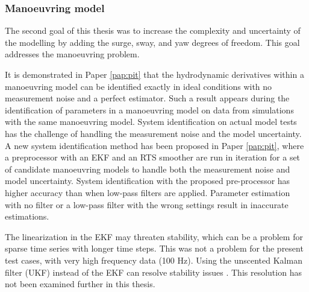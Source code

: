 \subsubsection*{\normalfont \color{black} \textbf{Manoeuvring model}}
The second goal of this thesis was to increase the complexity and uncertainty of the modelling by adding the surge, sway, and yaw degrees of freedom. This goal addresses the manoeuvring problem. 

It is demonstrated in Paper \ref{pap:pit} that the hydrodynamic derivatives within a manoeuvring model can be identified exactly in ideal conditions with no measurement noise and a perfect estimator. Such a result appears during the identification of parameters in a manoeuvring model on data from simulations with the same manoeuvring model.
System identification on actual model tests has the challenge of handling the measurement noise and the model uncertainty. A new system identification method has been proposed in Paper \ref{pap:pit}, where a preprocessor with an EKF and an RTS smoother are run in iteration for a set of candidate manoeuvring models to handle both the measurement noise and model uncertainty. System identification with the proposed pre-processor has higher accuracy than when low-pass filters are applied. Parameter estimation with no filter or a low-pass filter with the wrong settings result in inaccurate estimations. 

The linearization in the EKF may threaten stability, which can be a problem for sparse time series with longer time steps. This was not a problem for the present test cases, with very high frequency data (100 Hz). 
Using the unscented Kalman filter (UKF) instead of the EKF can resolve stability issues . This resolution has not been examined further in this thesis.

